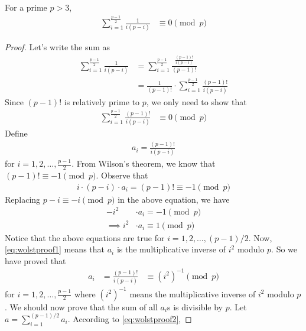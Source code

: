 \documentclass[12pt]{subfile}
\begin{document}
		\begin{lemma}\label{lem:wolstproof4}
			For a prime $p>3$,
				\begin{align*}
					\sum_{i=1}^{\frac{p-1}{2}} \frac{1}{i(p-i)}
						& \equiv 0 \pmod p
				\end{align*}
		\end{lemma}

		\begin{proof}
			Let's write the sum as
				\begin{align*}
					\sum_{i=1}^{\frac{p-1}{2}} \frac{1}{i(p-i)}
						& = \sum_{i=1}^{\frac{p-1}{2}} \frac{\frac{(p-1)!}{i(p-i)}}{(p-1)!}\\
						& = \frac{1}{(p-1)!} \cdot \sum_{i=1}^{\frac{p-1}{2}} \frac{(p-1)!}{i(p-i)}
				\end{align*}
			Since $(p-1)!$ is relatively prime to $p$, we only need to show that
				\begin{align*}
					\sum_{i=1}^{\frac{p-1}{2}} \frac{(p-1)!}{i(p-i)}
						& \equiv 0 \pmod p
				\end{align*}
			Define
				\begin{align*}
					a_i = \frac{(p-1)!}{i(p-i)}
				\end{align*}
			for $i=1,2,\ldots,\frac{p-1}{2}$. From Wilson's theorem, we know that $(p-1)! \equiv -1 \pmod p$. Observe that
				\begin{align*}
					i\cdot (p-i) \cdot a_i = (p-1)! \equiv -1 \pmod p
				\end{align*}
			Replacing $p-i \equiv -i \pmod p$ in the above equation, we have
				\begin{align}\label{eq:wolstproof1}
					-i^2
						& \cdot a_i = -1 \pmod p\\
					\implies i^2
						& \cdot a_i \equiv 1 \pmod p
				\end{align}
			Notice that the above equations are true for $i=1,2,\ldots,(p-1)/2$. Now, \eqref{eq:wolstproof1} means that $a_i$ is the multiplicative inverse of $i^2$ modulo $p$. So we have proved that
				\begin{align}\label{eq:wolstproof2}
					a_i
						& = \frac{(p-1)!}{i(p-i)}
						& \equiv (i^2)^{-1} \pmod p
				\end{align}
			for $i=1,2,\ldots,\frac{p-1}{2}$ where $(i^2)^{-1}$ means the multiplicative inverse of $i^2$ modulo $p$. We should now prove that the sum of all $a_i$s is divisible by $p$. Let $ a=\sum_{i=1}^{(p-1)/2} a_i$. According to \eqref{eq:wolstproof2},

\end{proof}
\end{document}
